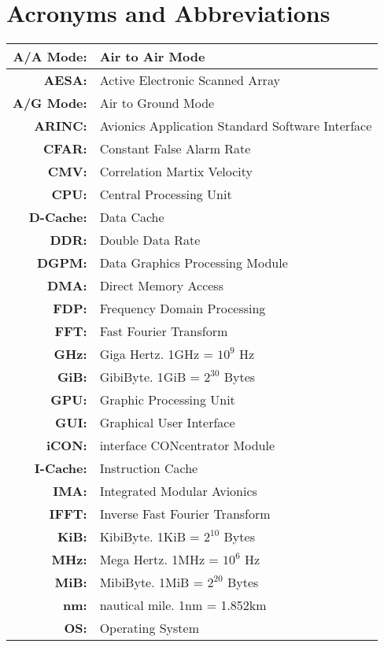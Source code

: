 \chapter*{Acronyms and Abbreviations}
\label{chap:acronyms}

\begin{center}
\begin{longtable}{|>{\bfseries}rl|}

\hline
A/A Mode: & Air to Air Mode \\ \hline
AESA: & Active Electronic Scanned Array \\ \hline
A/G Mode: & Air to Ground Mode \\ \hline
ARINC: & Avionics Application Standard Software Interface \\ \hline
CFAR: & Constant False Alarm Rate \\ \hline
CMV: & Correlation Martix Velocity \\ \hline
CPU: & Central Processing Unit \\ \hline
D-Cache: & Data Cache \\ \hline
DDR: & Double Data Rate \\ \hline
DGPM: & Data Graphics Processing Module \\ \hline
DMA: & Direct Memory Access \\ \hline
FDP: & Frequency Domain Processing \\ \hline
FFT: & Fast Fourier Transform \\ \hline
GHz: & Giga Hertz. 1GHz = $10^{9}$ Hz \\ \hline
GiB: & GibiByte. 1GiB = $2^{30}$ Bytes \\ \hline
GPU: & Graphic Processing Unit \\ \hline
GUI: & Graphical User Interface \\ \hline
iCON: & interface CONcentrator Module \\ \hline
I-Cache: & Instruction Cache \\ \hline
IMA: & Integrated Modular Avionics \\ \hline
IFFT: & Inverse Fast Fourier Transform \\ \hline
KiB: & KibiByte. 1KiB = $2^{10}$ Bytes \\ \hline
MHz: & Mega Hertz. 1MHz = $10^{6}$ Hz  \\ \hline
MiB: & MibiByte. 1MiB = $2^{20}$ Bytes \\ \hline
nm: & nautical mile. 1nm = 1.852km \\ \hline
OS: & Operating System \\ \hline

\end{longtable}
\end{center}
